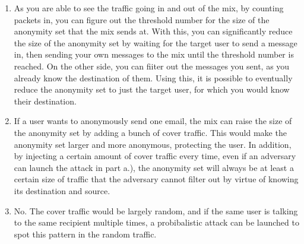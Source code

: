 \documentclass{jhwhw}
\begin{document}
\begin{enumerate}
\item As you are able to see the traffic going in and out of the mix, by counting packets in, you can figure out the threshold number for the size of the anonymity set that the mix sends at. With this, you can significantly reduce the size of the anonymity set by waiting for the target user to send a message in, then sending your own messages to the mix until the threshold number is reached. On the other side, you can fiiter out the messages you sent, as you already know the destination of them. Using this, it is possible to eventually reduce the anonymity set to just the target user, for which you would know their destination.
\item If a user wants to anonymously send one email, the mix can raise the size of the anonymity set by adding a bunch of cover traffic. This would make the anonymity set larger and more anonymous, protecting the user. In addition, by injecting a certain amount of cover traffic every time, even if an adversary can launch the attack in part a.), the anonymity set will always be at least a certain size of traffic that the adversary cannot filter out by virtue of knowing its destination and source.
\item No. The cover traffic would be largely random, and if the same user is talking to the same recipient multiple times, a probibalistic attack can be launched to spot this pattern in the random traffic.
\end{enumerate}
\end{document}
